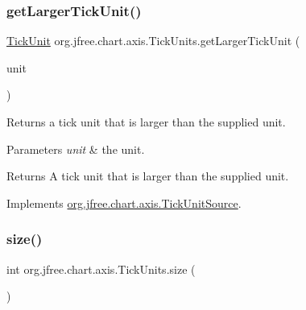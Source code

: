 \mbox{\label{classorg_1_1jfree_1_1chart_1_1axis_1_1_tick_units_a4f4719e1bb4772648808c0d00787a92d}} 
\subsubsection{\texorpdfstring{get\+Larger\+Tick\+Unit()}{getLargerTickUnit()}}
{\footnotesize\ttfamily \mbox{\hyperlink{classorg_1_1jfree_1_1chart_1_1axis_1_1_tick_unit}{Tick\+Unit}} org.\+jfree.\+chart.\+axis.\+Tick\+Units.\+get\+Larger\+Tick\+Unit (\begin{DoxyParamCaption}\item[{\mbox{\hyperlink{classorg_1_1jfree_1_1chart_1_1axis_1_1_tick_unit}{Tick\+Unit}}}]{unit }\end{DoxyParamCaption})}

Returns a tick unit that is larger than the supplied unit.


\begin{DoxyParams}{Parameters}
{\em unit} & the unit.\\
\hline
\end{DoxyParams}
\begin{DoxyReturn}{Returns}
A tick unit that is larger than the supplied unit. 
\end{DoxyReturn}


Implements \mbox{\hyperlink{interfaceorg_1_1jfree_1_1chart_1_1axis_1_1_tick_unit_source_ada1fecd32d2e0ff584a7d2a55ffc349a}{org.\+jfree.\+chart.\+axis.\+Tick\+Unit\+Source}}.

\mbox{\label{classorg_1_1jfree_1_1chart_1_1axis_1_1_tick_units_ac00d61ce729a587f941063cf4213b1d9}} 
\subsubsection{\texorpdfstring{size()}{size()}}
{\footnotesize\ttfamily int org.\+jfree.\+chart.\+axis.\+Tick\+Units.\+size (\begin{DoxyParamCaption}{ }\end{DoxyParamCaption})}

